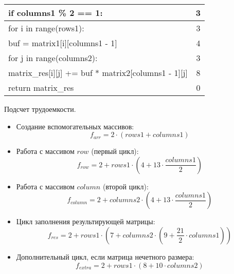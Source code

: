 \begin{itemize}
\begin{table}[h]
\begin{center}
\begin{threeparttable}
\begin{tabular}{|l|c|}
            \hline
            if columns1 \% 2 == 1: & 3 \\ 
            \hline
            for i in range(rows1): & 3 \\ 
            \hline
            buf = matrix1[i][columns1 - 1] & 4 \\ 
            \hline
            for j in range(columns2): & 3\\ 
            \hline
            matrix\_res[i][j] += buf * matrix2[columns1 - 1][j] & 8 \\ 
            \hline
            return matrix\_res & 0 \\ 
            \hline
		\end{tabular}
        \end{threeparttable}
    \end{center}
    \end{table}

    \FloatBarrier
    
    \clearpage
    Подсчет трудоемкости.
    
    \begin{itemize}
        \item Создание вспомогательных массивов: 
        \begin{equation}
            f_{arr} = 2 \cdot (rows1 + columns1)
        \end{equation}
        
        \item Работа с массивом $row$ (первый цикл):
        \begin{equation}
            f_{row} = 2 + rows1 \cdot (4 + 13 \cdot \frac{columns1}{2})
        \end{equation}
        
        \item Работа с массивом $column$ (второй цикл):
        \begin{equation}
            f_{column} = 2 + columns2 \cdot (4 + 13 \cdot \frac{columns1}{2})
        \end{equation}
        
        \item Цикл заполнения результирующей матрицы: 
        \begin{equation}
            f_{res} = 2 + rows1 \cdot (7 + columns2 \cdot (9 + \frac{21}{2} \cdot columns1))
        \end{equation}
        
        \item Дополнительный цикл, если матрица нечетного размера: 
        \begin{equation}
            f_{extra} = 2 + rows1 \cdot (8 + 10 \cdot columns2)
        \end{equation}
    \end{itemize}
    

\end{itemize}
